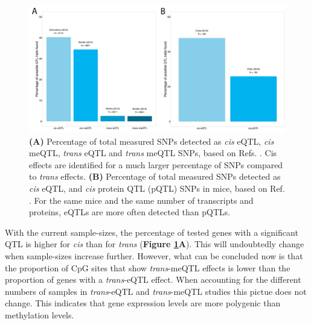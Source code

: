 \begin{figure}[H]
	\includegraphics[width=\textwidth]{chapters/chapter2-genetic-architecture/img/Figure3.png}
	\caption{\textbf{(A)} Percentage of total measured SNPs detected as \emph{cis} eQTL, \emph{cis} meQTL, \emph{trans} eQTL and \emph{trans} meQTL SNPs, based on Refs. \cite{zhernakovaIdentificationContextdependentExpression2017,gibsonExpressionQuantitativeTrait2015,wongInterplayCisTrans2017}. Cis effects are identified for a much larger percentage of SNPs compared to \emph{trans} effects. \textbf{(B)} Percentage of total measured SNPs detected as \emph{cis} eQTL, and \emph{cis} protein QTL (pQTL) SNPs in mice, based on Ref. \cite{GenomeWideMetabolicQTL}. For the same mice and the same number of transcripts and proteins, eQTLs are more often detected than pQTLs.}
	\label{architecture_fig3}
\end{figure}

With the current sample-sizes, the percentage of tested genes with a significant QTL is higher for \emph{cis} than for \emph{trans} (\textbf{Figure \ref{architecture_fig3}A}). This will undoubtedly change when sample-sizes increase further. However, what can be concluded now is that the proportion of CpG sites that show \emph{trans}-meQTL effects is lower than the proportion of genes with a \emph{trans}-eQTL effect. When accounting for the different numbers of samples in \emph{trans}-eQTL and \emph{trans}-meQTL studies this pictue does not change. This indicates that gene expression levels are more polygenic than methylation levels. 

